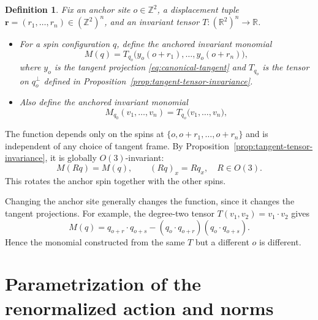 \documentclass[11pt]{article}
\numberwithin{equation}{section}
\newtheorem{definition}[theorem]{Definition}
\theoremstyle{definition}
\theoremstyle{plain}
\begin{document}
\begin{definition}
\label{def:anchored-invariant-monomial}
Fix an anchor site $o\in\mathbb Z^2$, a displacement tuple
$\mathbf r=(r_1,\ldots,r_n)\in(\mathbb Z^2)^n$, and an
invariant tensor $T:(\mathbb R^2)^n\to\mathbb R$.
\begin{itemize}
\item
For a spin configuration $q$, define the \emph{anchored invariant monomial}
\begin{equation}
 M(q) = 
 T_{q_o}\bigl(y_o(o+r_1),\ldots,y_o(o+r_n)\bigr),
 \label{eq:anchored-invariant-monomial}
\end{equation}
where $y_o$ is the tangent projection
\eqref{eq:canonical-tangent} and $T_{q_o}$ is the tensor on
$q_o^\perp$ defined in Proposition~\ref{prop:tangent-tensor-invariance}. 
\item
Also define the \emph{anchored invariant monomial}
\begin{equation}
 M_{q_0}(v_1,\dots, v_n) = 
 T_{q_o}\bigl(v_1,\dots,v_n\bigr),
\end{equation}
\end{itemize}
\end{definition}

The function depends only on the spins at
$\{o,o+r_1,\ldots,o+r_n\}$ and is independent of any choice
of tangent frame.  By
Proposition~\ref{prop:tangent-tensor-invariance}, it is globally
$O(3)$-invariant:
\begin{equation}
 M(Rq) =M(q),
 \qquad (Rq)_x=Rq_x,\quad R\in O(3).
\end{equation}
This rotates the anchor spin together with the other spins.

Changing the anchor site generally changes the function, since
it changes the tangent projections.
For example, the degree-two tensor $T(v_1,v_2)=v_1\cdot v_2$
gives
\begin{equation}
 M(q)
 =q_{o+r}\cdot q_{o+s}
    -(q_o\cdot q_{o+r})(q_o\cdot q_{o+s}).
\end{equation}
Hence the monomial constructed from the same $T$ but a different $o$
is different.


\newpage
\section{Parametrization of the renormalized action and norms}
\label{sec:coordinates}
\end{document}
